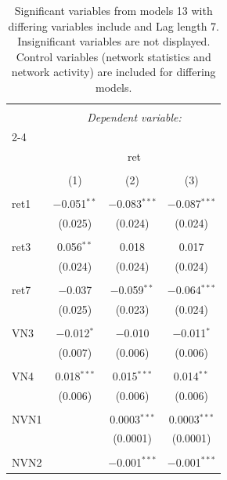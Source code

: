 
\begin{table}[!htbp] \centering 
  \caption{Significant variables from models 13 with differing variables include 
                               and Lag length 7. Insignificant variables are not displayed. 
                               Control variables (network statistics and network activity) are 
                               included for differing models.} 
  \label{Returnmodels2_t} 
\scriptsize 
\begin{tabular}{@{\extracolsep{5pt}}lccc} 
\\[-1.8ex]\hline 
\hline \\[-1.8ex] 
 & \multicolumn{3}{c}{\textit{Dependent variable:}} \\ 
\cline{2-4} 
\\[-1.8ex] & \multicolumn{3}{c}{ret} \\ 
\\[-1.8ex] & (1) & (2) & (3)\\ 
\hline \\[-1.8ex] 
 ret1 & $-$0.051$^{**}$ & $-$0.083$^{***}$ & $-$0.087$^{***}$ \\ 
  & (0.025) & (0.024) & (0.024) \\ 
  & & & \\ 
 ret3 & 0.056$^{**}$ & 0.018 & 0.017 \\ 
  & (0.024) & (0.024) & (0.024) \\ 
  & & & \\ 
 ret7 & $-$0.037 & $-$0.059$^{**}$ & $-$0.064$^{***}$ \\ 
  & (0.025) & (0.023) & (0.024) \\ 
  & & & \\ 
 VN3 & $-$0.012$^{*}$ & $-$0.010 & $-$0.011$^{*}$ \\ 
  & (0.007) & (0.006) & (0.006) \\ 
  & & & \\ 
 VN4 & 0.018$^{***}$ & 0.015$^{***}$ & 0.014$^{**}$ \\ 
  & (0.006) & (0.006) & (0.006) \\ 
  & & & \\ 
 NVN1 &  & 0.0003$^{***}$ & 0.0003$^{***}$ \\ 
  &  & (0.0001) & (0.0001) \\ 
  & & & \\ 
 NVN2 &  & $-$0.001$^{***}$ & $-$0.001$^{***}$ \\ 

\end{tabular}
\end{table}
